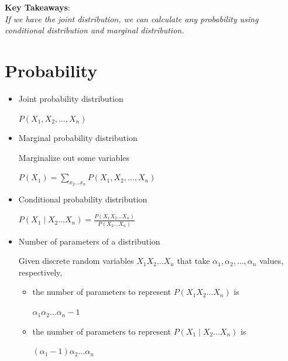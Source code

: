 \documentclass[11pt,a4paper]{report}
\begin{document}
\textbf{\color{blue}Key Takeaways}: \\ \textit{\color{blue}If we have the joint distribution, we can calculate any probability using conditional distribution and marginal distribution.}

\section{Probability}

\begin{itemize}
    \item Joint probability distribution
    \begin{center}
        $P(X_{1}, X_{2}, \ldots, X_{n})$
    \end{center}

    \item Marginal probability distribution
    
    Marginalize out some variables
    \begin{center}
        $P(X_{1}) = \sum_{x_{2} \ldots x_{n}} P(X_{1}, X_{2}, \ldots, X_{n})$
    \end{center}

    \item Conditional probability distribution
    \begin{center}
        $P(X_{1} \mid X_{2} \ldots X_{n}) = \frac{P(X_{1} X_{2} \ldots X_{n})}{P(X_{2} \ldots X_{n})}$
    \end{center}

    \item Number of parameters of a distribution

    Given discrete random variables $X_{1} X_{2} \ldots X_{n}$ that take $\alpha_{1}, \alpha_{2}, \ldots, \alpha_{n}$ values, respectively, 
    
    \begin{itemize}
        \item  the number of parameters to represent $P(X_{1}X_{2} \ldots X_{n})$ is 
        \begin{center}
            $ \alpha_{1} \alpha_{2} \ldots \alpha_{n} - 1$
        \end{center}

        \item  the number of parameters to represent $P(X_{1} \mid X_{2} \ldots X_{n})$ is 
        \begin{center}
            $ (\alpha_{1} - 1) \alpha_{2} \ldots \alpha_{n}$
        \end{center}

    \end{itemize}
\end{itemize}
\end{document}
